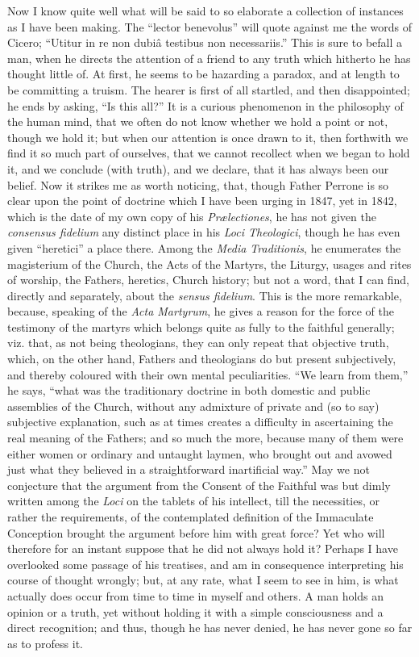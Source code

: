 Now I know quite well what will be said to so elaborate a collection of
instances as I have been making. The ``lector benevolus'' will quote
against me the words of Cicero; ``Utitur in re non dubiâ testibus non
necessariis.'' This is sure to befall a man, when he directs the
attention of a friend to any truth which hitherto he has thought little
of. At first, he seems to be hazarding a paradox, and at length to be
committing a truism. The hearer is first of all startled, and then
disappointed; he ends by asking, ``Is this all?'' It is a curious
phenomenon in the philosophy of the human mind, that we often do not
know whether we hold a point or not, though we hold it; but when our
attention is once drawn to it, then forthwith we find it so much part of
ourselves, that we cannot recollect when we began to hold it, and we
conclude (with truth), and we declare, that it has always been our
belief. Now it strikes me as worth noticing, that, though Father Perrone
is so clear upon the point of doctrine which I have been urging in 1847,
yet in 1842, which is the date of my own copy of his \emph{Prælectiones},
he has not given the \emph{consensus fidelium} any distinct place in his
\emph{Loci Theologici}, though he has even given ``heretici'' a place
there. Among the \emph{Media Traditionis}, he enumerates the magisterium
of the Church, the Acts of the Martyrs, the Liturgy, usages and rites of
worship, the Fathers, heretics, Church history; but not a word, that I
can find, directly and separately, about the \emph{sensus fidelium}.
This is the more remarkable, because, speaking of the \emph{Acta Martyrum},
he gives a reason for the force of the testimony of the martyrs which
belongs quite as fully to the faithful generally; viz. that, as not
being theologians, they can only repeat that objective truth, which, on
the other hand, Fathers and theologians do but present subjectively, and
thereby coloured with their own mental peculiarities. ``We learn from
them,'' he says, ``what was the traditionary doctrine in both domestic and
public assemblies of the Church, without any admixture of private
and (so to say) subjective explanation, such as at times creates a
difficulty in ascertaining the real meaning of the Fathers; and so much
the more, because many of them were either women or ordinary and
untaught laymen, who brought out and avowed just what they believed in a
straightforward inartificial way.'' May we not conjecture that the
argument from the Consent of the Faithful was but dimly written among
the \emph{Loci} on the tablets of his intellect, till the necessities,
or rather the requirements, of the contemplated definition of the
Immaculate Conception brought the argument before him with great force?
Yet who will therefore for an instant suppose that he did not always
hold it? Perhaps I have overlooked some passage of his treatises, and am
in consequence interpreting his course of thought wrongly; but, at any
rate, what I seem to see in him, is what actually does occur from time
to time in myself and others. A man holds an opinion or a truth, yet
without holding it with a simple consciousness and a direct recognition;
and thus, though he has never denied, he has never gone so far as to
profess it.

